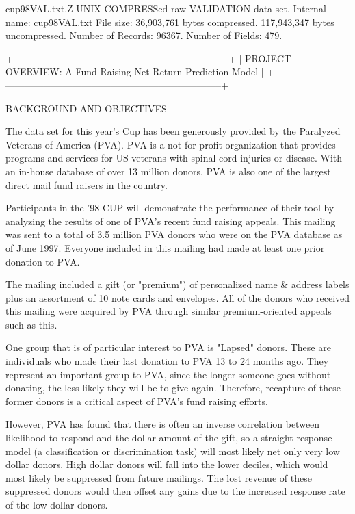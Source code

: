 \documentclass[
  11pt,
  a4paper,
  DIV=12,captions=tableheading,oneside,titlepage]{scrbook}
\let\oldverbatim\verbatim
\let\endoldverbatim\endverbatim
\renewenvironment{verbatim}{\footnotesize\oldverbatim}{\endoldverbatim}
\begin{document}
\begin{verbatim}
cup98VAL.txt.Z  UNIX COMPRESSed raw VALIDATION data set. 
                Internal name: cup98VAL.txt 
                File size: 36,903,761 bytes compressed. 117,943,347 
                bytes uncompressed.
                Number of Records: 96367.
                Number of Fields: 479.


+--------------------------------------------------------------------+
| PROJECT OVERVIEW: A Fund Raising Net Return Prediction Model       | 
+--------------------------------------------------------------------+

BACKGROUND AND OBJECTIVES
-------------------------

The data set for this year's Cup has been generously provided by the
Paralyzed Veterans of America (PVA).  PVA is a not-for-profit
organization that provides programs and services for US veterans with
spinal cord injuries or disease.  With an in-house database of over 13
million donors, PVA is also one of the largest direct mail fund
raisers in the country.

Participants in the '98 CUP will demonstrate the performance of their
tool by analyzing the results of one of PVA's recent fund raising
appeals.  This mailing was sent to a total of 3.5 million PVA donors
who were on the PVA database as of June 1997.  Everyone included in
this mailing had made at least one prior donation to PVA.

The mailing included a gift (or "premium") of personalized name &
address labels plus an assortment of 10 note cards and envelopes.  All
of the donors who received this mailing were acquired by PVA through
similar premium-oriented appeals such as this.

One group that is of particular interest to PVA is "Lapsed" donors.
These are individuals who made their last donation to PVA 13 to 24
months ago.  They represent an important group to PVA, since the
longer someone goes without donating, the less likely they will be to
give again.  Therefore, recapture of these former donors is a critical
aspect of PVA's fund raising efforts.

However, PVA has found that there is often an inverse correlation
between likelihood to respond and the dollar amount of the gift, so a
straight response model (a classification or discrimination task) will
most likely net only very low dollar donors.  High dollar donors will
fall into the lower deciles, which would most likely be suppressed
from future mailings.  The lost revenue of these suppressed donors
would then offset any gains due to the increased response rate of the
low dollar donors.


\end{verbatim}
\end{document}
